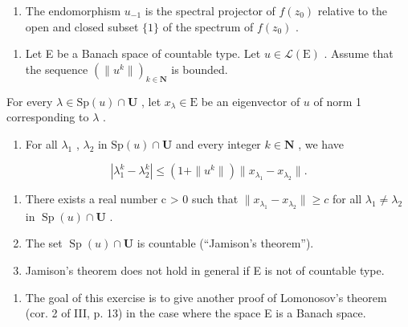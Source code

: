 \begin{enumerate}
\def\labelenumi{\alph{enumi})}
\setcounter{enumi}{4}
\tightlist
\item
  The endomorphism \(u_{-1}\) is the spectral projector of \(f(z_0)\) relative to the open and closed subset \(\{1\}\) of the spectrum of \(f(z_0)\) .
\end{enumerate}

\begin{enumerate}
\def\labelenumi{\arabic{enumi})}
\setcounter{enumi}{3}
\tightlist
\item
  Let E be a Banach space of countable type. Let \(u \in \mathcal{L}(\mathrm{E})\) . Assume that the sequence \((\| u^k \|)_{k \in \mathbf{N}}\) is bounded.
\end{enumerate}

For every \(\lambda\in\mathrm{Sp}(u)\cap\mathbf{U}\) , let \(x_{\lambda}\in\mathrm{E}\) be an eigenvector of \(u\) of norm 1 corresponding to \(\lambda\) .

\begin{enumerate}
\def\labelenumi{\alph{enumi})}
\tightlist
\item
  For all \(\lambda_1\) , \(\lambda_2\) in \(\mathrm{Sp}(u) \cap \mathbf{U}\) and every integer \(k \in \mathbf{N}\) , we have
\end{enumerate}

\[
\left| \lambda_ {1} ^ {k} - \lambda_ {2} ^ {k} \right| \leqslant \left(1 + \| u ^ {k} \|\right) \| x _ {\lambda_ {1}} - x _ {\lambda_ {2}} \|.
\]

\begin{enumerate}
\def\labelenumi{\alph{enumi})}
\setcounter{enumi}{1}
\item
  There exists a real number c \textgreater{} 0 such that \(\|x_{\lambda_{1}} - x_{\lambda_{2}}\| \geqslant c\) for all \(\lambda_{1} \neq \lambda_{2}\) in \(\operatorname{Sp}(u) \cap \mathbf{U}\) .
\item
  The set \(\operatorname{Sp}(u) \cap \mathbf{U}\) is countable (“Jamison’s theorem”).
\item
  Jamison's theorem does not hold in general if E is not of countable type.
\end{enumerate}

\begin{enumerate}
\def\labelenumi{\arabic{enumi})}
\setcounter{enumi}{4}
\tightlist
\item
  The goal of this exercise is to give another proof of Lomonosov's theorem (cor. 2 of III, p. 13) in the case where the space E is a Banach space.
\end{enumerate}

